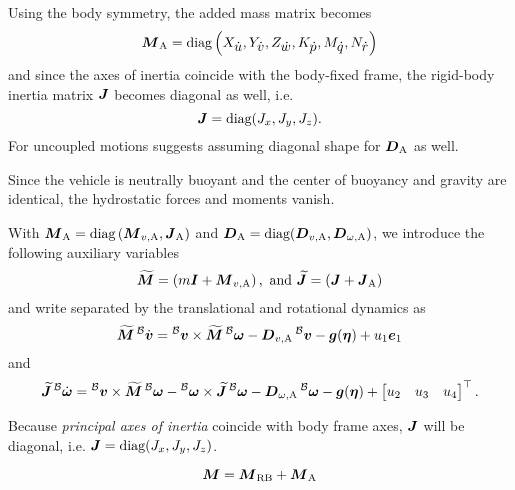 Using the body symmetry, the added mass matrix becomes 
\begin{equation}
	\mbox{$\bm{M}$}_\text{A} =
	\text{diag}\left(X_{\mbox{$\dot{u}$}}, Y_{\mbox{$\dot{v}$}}, Z_{\mbox{$\dot{w}$}}, K_{\mbox{$\dot{p}$}}, M_{\mbox{$\dot{q}$}}, N_{\mbox{$\dot{r}$}}\right)
\end{equation}
and since the axes of inertia coincide with the body-fixed frame, the rigid-body inertia matrix $\mbox{$\bm{J}$}$ becomes diagonal as well, i.e.
\begin{equation}
	\mbox{$\bm{J}$} = \text{diag}(J_x, J_y, J_z)
	.
\end{equation}
For uncoupled motions \cite{Fossen11} suggests assuming diagonal shape for $\mbox{$\bm{D}$}_\text{A}$ as well. 


Since the vehicle is neutrally buoyant and the center of buoyancy and gravity are identical, the hydrostatic forces and moments vanish.

With $\mbox{$\bm{M}$}_\text{A} = \text{diag}\left(\mbox{$\bm{M}$}_{v, \text{A}}, \mbox{$\bm{J}$}_\text{A}\right)$ and $\mbox{$\bm{D}$}_\text{A} = \text{diag}(\mbox{$\bm{D}$}_{v,\text{A}}, \mbox{$\bm{D}$}_{\omega,\text{A}})$, we introduce the following auxiliary variables
\begin{equation}
	\mbox{$\widetilde{\bm{M}}$} = \left(m\mbox{$\bm{I}$} + \mbox{$\bm{M}$}_{v, \text{A}}\right),\text{ and }
	\mbox{$\widetilde{\bm{J}}$} = \left(\mbox{$\bm{J}$} + \mbox{$\bm{J}$}_\text{A}\right)
\end{equation}
and write  separated by the translational and rotational dynamics as
\begin{equation}
	\label{eq:equation-of-motion-translational}
	\Mbs \vlinbodydot = \vlinbody \times \Mbs \vangbody - \Dvadded \vlinbody - \gb(\etab) + u_1 \eb_1
\end{equation}
and
\begin{equation}
	\label{eq:equation-of-motion-rotational}
	\Jbs \vangbodydot =
	\vlinbody \times \Mbs \vangbody
	- \vangbody \times \Jbs \vangbody
	- \Domegaadded \vangbody
	- \gb(\etab)
	+ \begin{bmatrix}
		u_2 & u_3 & u_4	
	\end{bmatrix}^\top
	.
\end{equation}







Because \emph{principal axes of inertia} coincide with body frame axes, $\mbox{$\bm{J}$}$ will be diagonal, i.e. $\mbox{$\bm{J}$} = \text{diag}(J_x, J_y, J_z)$.


\begin{equation}
\mbox{$\bm{M}$} = \mbox{$\bm{M}$}_\text{RB} + \mbox{$\bm{M}$}_\text{A}
\end{equation}

